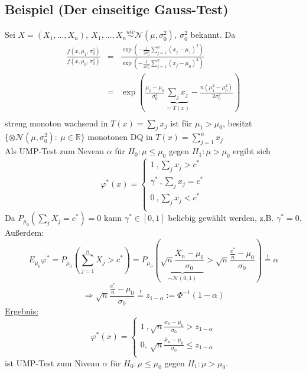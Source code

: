 \documentclass[a4paper,11pt,twoside,titlepage]{article}
\newcommand{\R}{{\mathbb R}}
\newcommand\NN{ \mathcal{N} } %
\newcommand{\uiv}{\ensuremath{\stackrel{uiv}{\sim}}}
\begin{document}
\subsection{Beispiel (Der einseitige Gauss-Test)}
Sei $X=(X_1,\ldots,X_n),\ X_1,\ldots,X_n\uiv\NN(\mu,\sigma_0^2),\ \sigma_0^2$ bekannt. Da
\begin{eqnarray*}
\frac{f(x,\mu_1,\sigma_0^2)}{f(x,\mu_0,\sigma^2_0)}&=&\frac{\exp(-\frac{1}{2\sigma_0^2}\sum_{j=1}^n(x_j-\mu_1)^2)}
{\exp(-\frac{1}{2\sigma_0^2}\sum_{j=1}^n(x_j-\mu_0)^2)}\\
&=&\exp(\frac{\mu_1-\mu_0}{\sigma_0^2}\underbrace{\sum_jx_j}_{=T(x)}-\frac{n(\mu_1^2-\mu_0^2)}{2\sigma_0^2})\\
\end{eqnarray*}
streng monoton wachsend in $T(x)=\sum_jx_j$ ist für $\mu_1>\mu_0$, besitzt\\
$\{\otimes\NN(\mu,\sigma_0^2):\ \mu\in\R\}$ monotonen DQ in $T(x)=\sum_{j=1}^nx_j$\\
Als UMP-Test  zum Neveau $\alpha$ für $H_0:\mu\leq\mu_0$ gegen $H_1:\mu>\mu_0$ ergibt sich
$$\varphi^\ast(x)=\left\{
\begin{matrix}1\ ,\sum_jx_j>c^\ast\\\gamma^\ast\ ,\sum_jx_j=c^\ast\\0\ ,\sum_jx_j<c^\ast\\\end{matrix}\right.$$
Da $P_{\mu_0}(\sum_jX_j=c^\ast)=0$ kann $\gamma^\ast\in[0,1]$ beliebig gewählt werden, z.B. $\gamma^\ast=0$. Außerdem:
\[E_{\mu_0}\varphi^\ast=P_{\mu_0}(\sum_{j=1}^nX_j>c^\ast)=P_{\mu_0}(\underbrace{\sqrt{n}\frac{\bar{X}_n-\mu_0}{\sigma_0}}_{\sim\NN(0,1)}>\sqrt{n}\frac{\frac{c^\ast}{n}-\mu_0}{\sigma_0})\stackrel{!}{=}\alpha\]
$$\Rightarrow\sqrt{n}\frac{\frac{c^\ast}{n}-\mu_0}{\sigma_0}\stackrel{!}{=}z_{1-\alpha}:=\Phi^{-1}(1-\alpha)$$
\underline{Ergebnis:}
$$\varphi^\ast(x)=\left\{\begin{matrix}1\ ,\sqrt{n}\frac{\bar{x}_n-\mu_0}{\sigma_0}>z_{1-\alpha}\\
0,\ \sqrt{n}\frac{\bar{x}_n-\mu_0}{\sigma_0}\leq z_{1-\alpha}\\\end{matrix}\right.$$
ist UMP-Test zum Niveau $\alpha$ für $H_0:\mu\leq\mu_0$ gegen $H_1:\mu>\mu_0$.
\end{document}
